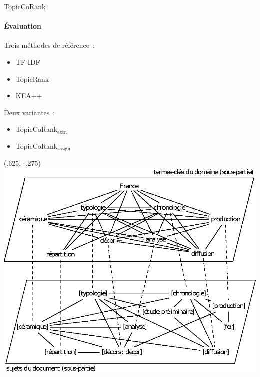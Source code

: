 \begin{frame}{TopicCoRank}\framesubtitle{Évaluation}
    Trois méthodes de référence~:
    \begin{itemize}
      \item{TF-IDF~\cite{salton1975tfidf}}
      \item{TopicRank~\cite{bougouin2013topicrank}}
      \item{KEA++~\cite{medelyan2006kea++}}
    \end{itemize}

    \vspace{1em}

    Deux variantes~:
    \begin{itemize}
      \item{TopicCoRank$_\text{extr.}$}
      \item{TopicCoRank$_\text{assign.}$}
    \end{itemize}

    \begin{textblock*}{.4\textwidth}(.625\textwidth, -.275\textheight)
      \centering
      \includegraphics[width=\textwidth]{include/topiccorank_graph.eps}
    \end{textblock*}
\end{frame}

